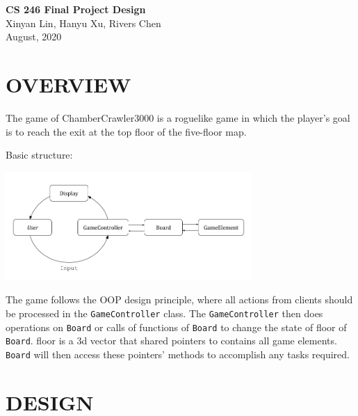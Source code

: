 \documentclass[11pt]{article}
\theoremstyle{plain} \newtheorem{theorem*}{Theorem}[subsection]
\begin{document}
\begin{center}
{\LARGE \textbf{CS 246 Final Project Design}}\\
\vspace{0.15 in}
Xinyan Lin, Hanyu Xu, Rivers Chen\\ 
\vspace{0.07 in} August, 2020 
\end{center}

\vspace{0.3 in} 
\section{OVERVIEW} 
The game of ChamberCrawler3000 is a roguelike game in which the player’s goal
is to reach the exit at the top floor of the five-floor map.  

Basic structure:
\begin{center}
\includegraphics[width=0.7\textwidth]{Flow-chart.png}
\end{center}

The game follows the OOP design principle, where all actions from clients
should be processed in the \texttt{GameController} class. The 
\texttt{GameController} then does operations on \texttt{Board} or calls 
of functions of \texttt{Board} to change the state of \textsf{floor} of
\texttt{Board}. \textsf{floor} is a 3d vector that shared pointers to
contains all game elements. \texttt{Board} will then access these pointers'
methods to accomplish any tasks required.\\



\section{DESIGN} 
\end{document}
